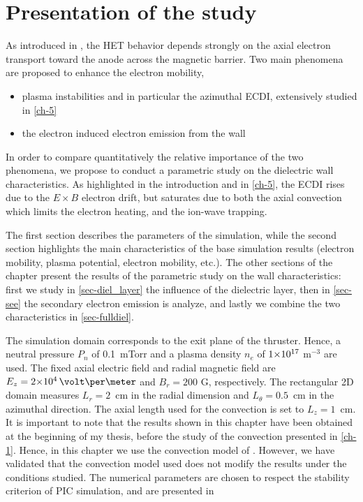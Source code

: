  

\section{Presentation of the study}
  \label{sec-params}
  
  
  
  As introduced in , the \ac{HET} behavior depends strongly on the axial electron transport toward the anode across the magnetic barrier.
  Two main phenomena are proposed to enhance the electron mobility,
  \begin{itemize}
    \item plasma instabilities and in particular the azimuthal \ac{ECDI}, extensively studied in \cref{ch-5}
    \item the electron induced electron emission from the wall
  \end{itemize}
  In order to compare quantitatively the relative importance of the two phenomena, we propose to conduct a parametric study on the dielectric wall characteristics.
  As highlighted in the introduction and in \cref{ch-5}, the \ac{ECDI} rises due to the $E \times B$ electron drift, but saturates due to both the axial convection which limits the electron heating, and the ion-wave trapping.
  
  The first section describes the parameters of the simulation, 
  while the second section highlights the main characteristics of the base simulation results (electron mobility, plasma potential, electron mobility, etc.).
  The other sections of the chapter present the results of the parametric study on the wall characteristics\string: first we study in \cref{sec-diel_layer} the influence of the dielectric layer, then in \cref{sec-see} the secondary electron emission is analyze, and lastly we combine the two characteristics in \cref{sec-fulldiel}.


  The simulation domain corresponds to the exit plane of the thruster.
  Hence, a neutral pressure $P_n$ of 0.1~mTorr and a plasma density $n_e$ of ${{1}{\times}10^{17}}$ m$^{-3}$ are used.
  The fixed axial electric field and radial magnetic field are $E_z=\sn{2}{4}\,\volt\per\meter$ and $B_r=200$ G, respectively.
  The rectangular \acs{2D} domain measures $L_r=2$~cm in the radial dimension and $L_{\theta}=0.5$~cm in the azimuthal direction.
  The axial length used for the convection is set to $L_z=1$~cm.
  It is important to note that the results shown in this chapter have been obtained at the beginning of my thesis, before the study of the convection presented in \cref{ch-1}.
  Hence, in this chapter we use the convection model of \citet{lafleur2016a}.
  However, we have validated that the convection model used does not modify the results under the conditions studied.
  The numerical parameters are chosen to respect the stability criterion of \ac{PIC} simulation, and are presented in 
  
